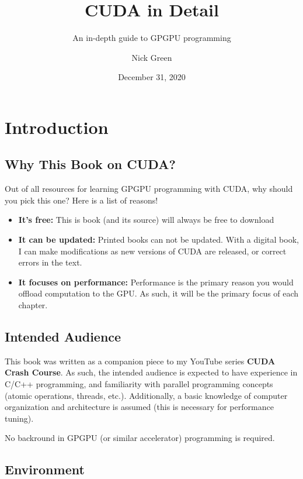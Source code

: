 \documentclass[11pt,fancy,authoryear]{elegantbook}
\title{CUDA in Detail}
\subtitle{An in-depth guide to GPGPU programming}
\author{Nick Green}
\institute{CoffeeBeforeArch}
\date{December 31, 2020}
\begin{document}
\maketitle

\frontmatter
\tableofcontents

\mainmatter

\chapter{Introduction}

\section{Why This Book on CUDA?}

Out of all resources for learning GPGPU programming with CUDA, why should you pick this one? Here is a list of reasons!

\begin{itemize}
  \item \textbf{It's free:} This is book (and its source) will always be free to download
  \item \textbf{It can be updated:} Printed books can not be updated. With a digital book, I can make modifications as new versions of CUDA are released, or correct errors in the text.
  \item \textbf{It focuses on performance:} Performance is the primary reason you would offload computation to the GPU. As such, it will be the primary focus of each chapter.
\end{itemize}

\section{Intended Audience}

This book was written as a companion piece to my YouTube series \textbf{CUDA Crash Course}. As such, the intended audience is expected to have experience in C/C++ programming, and familiarity with parallel programming concepts (atomic operations, threads, etc.). Additionally, a basic knowledge of computer organization and architecture is assumed (this is necessary for performance tuning).

No backround in GPGPU (or similar accelerator) programming is required.

\section{Environment}
\end{document}
